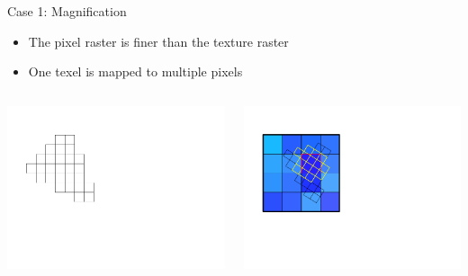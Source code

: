 \documentclass[utf8,stillsansserifmath,fleqn,t]{beamer}
\begin{document}
\begin{frame}[label=texture-mapping-magnification]
\frametitle{\insertsection}
Case 1: Magnification
\begin{itemize}
\item The pixel raster is finer than the texture raster
\item One texel is mapped to multiple pixels
\end{itemize}
\begin{columns}
\centerline{\includegraphics[width=.6\textwidth]{./fig/texture-mag-0.pdf}}
\centerline{\includegraphics[width=.8\textwidth]{./fig/texture-mag-1.pdf}}
\end{columns}
\end{frame}
\end{document}
